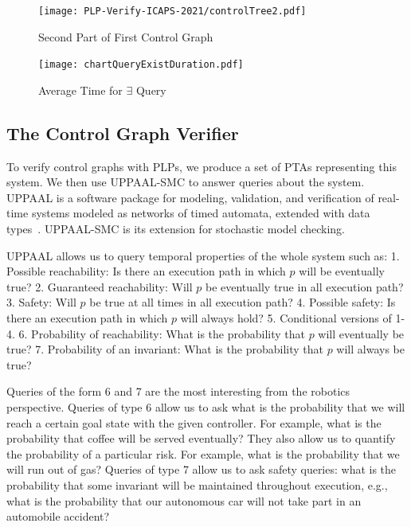 \documentclass[letterpaper]{article}
\begin{document}

\begin{figure}[]
\centering
\texttt{[image: PLP-Verify-ICAPS-2021/controlTree2.pdf]}
\vspace{-0.08in}
\caption{Second Part of First Control Graph}
\label{fig:controlTree2}
\end{figure}

\begin{figure}[h]
\centering
  \texttt{[image: chartQueryExistDuration.pdf]}
  \vspace{-0.18in} 
  \caption{Average Time for $\exists$ Query}
  \label{fig:time-exists} 
\end{figure} 


\subsection{The Control Graph Verifier}
To verify control graphs with PLPs, we produce a set of PTAs representing this system. We then use UPPAAL-SMC  to answer queries about the system. UPPAAL is a software package for modeling, validation, and verification of real-time systems modeled as networks of timed automata, extended with data types~\citep{BehrmannDLHPYH06}. UPPAAL-SMC is its extension for stochastic model checking.


UPPAAL allows us to query temporal properties of the whole system such as: 1. Possible reachability: Is there an execution path in which $p$ will be eventually true? 2. Guaranteed reachability: Will $p$ be eventually true in all execution path? 3. Safety: Will $p$ be true at all times in all execution path? 4. Possible safety: Is there an execution path in which $p$ will always hold? 5.  Conditional versions of 1-4. 
6. Probability of reachability: What is the probability that $p$ will eventually be true? 7. Probability of an invariant: What is the probability that $p$ will always be true?

Queries of the form 6 and 7 are the most interesting from the robotics perspective. Queries of type 6 allow us to ask what is the probability that we will reach a certain goal state with the given controller. For example, what is the probability that coffee will be served eventually? They also allow us to quantify the probability of a particular risk.
For example, what is the probability that we will run out of gas? Queries of type 7 allow us to ask safety queries: what is the probability that some invariant will be maintained throughout execution, e.g., what is the probability that our autonomous car will not take part in an automobile accident?
\end{document}
